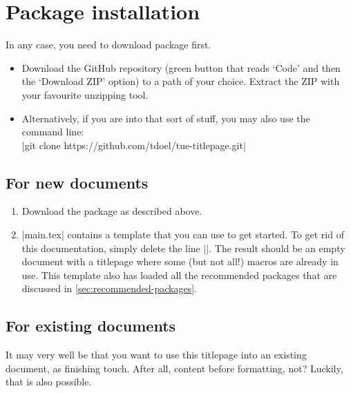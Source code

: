 \section{Package installation}
In any case, you need to download package first.
\begin{itemize}
  \item Download the GitHub repository (green button that reads `Code' and then the `Download ZIP' option) to a path of your choice. Extract the ZIP with your favourite unzipping tool.
  \item Alternatively, if you are into that sort of stuff, you may also use the command line:\\
  |git clone https://github.com/tdoel/tue-titlepage.git|
\end{itemize}

\subsection{For new documents}
\begin{enumerate}
  \item Download the package as described above.
  \item |main.tex| contains a template that you can use to get started. To get rid of this documentation, simply delete the line ||. The result should be an empty document with a titlepage where some (but not all!) macros are already in use. This template also has loaded all the recommended packages that are discussed in \cref{sec:recommended-packages}.
\end{enumerate}

\subsection{For existing documents}
It may very well be that you want to use this titlepage into an existing document, as finishing touch. After all, content before formatting, not? Luckily, that is also possible.


